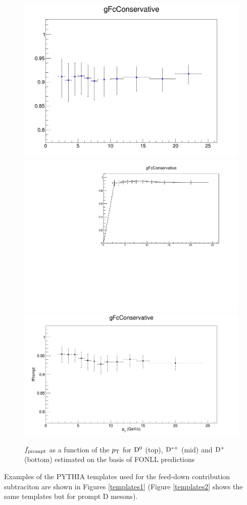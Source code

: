 \begin{figure}
\centering
\includegraphics[width=0.6\linewidth]{figures/Effs/fprompt_D0.png}
\includegraphics[width=0.6\linewidth]{figures/DStar_pp/Fprompt_Dstar.pdf}
\includegraphics[width=0.6\linewidth]{figures/Effs/fpromptDplus.png}
\caption{$f_{\rm prompt}$ as a function of the $p_{\rm T}$ for ${\rm D^0}$ (top), ${\rm D^{*+}}$ (mid) and ${\rm D^+}$ (bottom) estimated on the basis of FONLL predictions}
\label{fprompt}
\end{figure}

Examples of the PYTHIA templates used for the feed-down contribution subtraciton are shown in Figures \ref{templates1} (Figure \ref{templates2} shows the same templates but for prompt D mesons).

